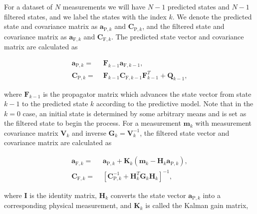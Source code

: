 \documentclass[10pt]{article}
\begin{document}
\noindent For a dataset of $N$ measurements we will have $N-1$ predicted states and $N-1$ filtered states, and we label the states
with the index $k$.  We denote the predicted state and covariance matrix as $\mathbf{a}_{\mathrm{P},k}$ and $\mathbf{C}_{\mathrm{P},k}$, and the 
filtered state and covariance matrix as $\mathbf{a}_{\mathrm{F},k}$ and $\mathbf{C}_{\mathrm{F},k}$.  The predicted state vector and covariance matrix
are calculated as

\begin{equation}
 \begin{split}
  \mathbf{a}_{\mathrm{P},k} = & \,\,\mathbf{F}_{k-1}\mathbf{a}_{\mathrm{F},k-1},\\
  \mathbf{C}_{\mathrm{P},k} = & \,\,\mathbf{F}_{k-1}\mathbf{C}_{\mathrm{F},k-1}\mathbf{F}_{k-1}^{T} + \mathbf{Q}_{k-1},
 \end{split}
\end{equation}

\noindent where $\mathbf{F}_{k-1}$ is the propagator matrix which advances the state vector from state $k-1$ to the predicted state $k$ according to the
predictive model.  Note that in the $k = 0$ case, an initial state is determined by some arbitrary means and is set as the filtered state to begin the process.  
For a measurement $\mathbf{m}_{k}$ with measurement covariance matrix $\mathbf{V}_{k}$ and inverse $\mathbf{G}_{k} = \mathbf{V}_{k}^{-1}$, the filtered 
state vector and covariance matrix are calculated as

\begin{equation}
 \begin{split}
  \mathbf{a}_{\mathrm{F},k} = & \,\,\mathbf{a}_{\mathrm{P},k} + \mathbf{K}_{k}(\mathbf{m}_{k} - \mathbf{H}_{k}\mathbf{a}_{\mathrm{P},k}),\\
  \mathbf{C}_{\mathrm{F},k} = & \,\,[\mathbf{C}_{\mathrm{P},k}^{-1} + \mathbf{H}_{k}^{T}\mathbf{G}_{k}\mathbf{H}_{k}]^{-1},
 \end{split}
\end{equation}

\noindent where $\mathbf{I}$ is the identity matrix, $\mathbf{H}_{k}$ converts the state vector $\mathbf{a}_{\mathrm{P},k}$ into a corresponding physical measurement, 
and $\mathbf{K}_{k}$ is called the Kalman gain matrix,
\end{document}

